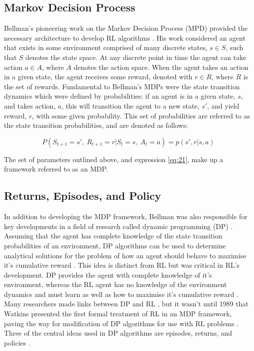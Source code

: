 \subsection{Markov Decision Process}
Bellman's pioneering work on the Markov Decision Process (MPD) provided the necessary architecture to develop RL algorithms \cite{Bellm1957}. His work considered an agent that exists in some environment comprised of many discrete states, $s \in S$, such that $S$ denotes the state space. At any discrete point in time the agent can take action $a \in A$, where $A$ denotes the action space. When the agent takes an action in a given state, the agent receives some reward, denoted with $r \in R$, where $R$ is the set of rewards. Fundamental to Bellman's MDPs were the state transition dynamics which were defined by probabilities: if an agent is in a given state, $s$, and takes action, $a$, this will transition the agent to a new state, $s'$, and yield reward, $r$, with some given probability. This set of probabilities are referred to as the state transition probabilities, and are denoted as follows:

\begin{equation}
	P(S_{t+1} = s', \ R_{t+1} = r | S_t = s, \ A_t = a) = p(s', r | s, a) \label{eq:21}
\end{equation}

The set of parameters outlined above, and expression \ref{eq:21}, make up a framework referred to as an MDP.

\subsection{Returns, Episodes, and Policy} \label{rep}
In addition to  developing the MDP framework, Bellman was also responsible for key developments in a field of research called dynamic programming (DP) \cite{Bellm1954}. Assuming that the agent has complete knowledge of the state transition probabilities of an environment, DP algorithms can be used to determine analytical solutions for the problem of how an agent should behave to maximise it's cumulative reward \cite{Bellm1954, Howard1960}. This idea is distinct from RL but was critical in RL's development. DP provides the agent with complete knowledge of it's environment, whereas the RL agent has no knowledge of the environment dynamics and must learn as well as how to maximise it's cumulative reward \cite{Sutton2018}. Many researchers made links between DP and RL \cite{Bellm1959, Witten1977, Werbos1987}, but it wasn't until 1989 that Watkins presented the first formal treatment of RL in an MDP framework, paving the way for modification of DP algorithms for use with RL problems \cite{Watkins1989}. Three of the central ideas used in DP algorithms are episodes, returns, and policies \cite{Sutton2018}.

